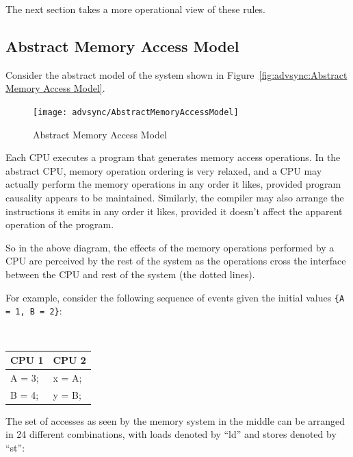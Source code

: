 The next section takes a more operational view of these rules.

\subsection{Abstract Memory Access Model}

Consider the abstract model of the system shown in
Figure~\ref{fig:advsync:Abstract Memory Access Model}.

\begin{figure}[htb]
\begin{center}
\texttt{[image: advsync/AbstractMemoryAccessModel]}
\end{center}
\caption{Abstract Memory Access Model}
\end{figure}

Each CPU executes a program that generates memory access operations.  In the
abstract CPU, memory operation ordering is very relaxed, and a CPU may actually
perform the memory operations in any order it likes, provided program causality
appears to be maintained.  Similarly, the compiler may also arrange the
instructions it emits in any order it likes, provided it doesn't affect the
apparent operation of the program.

So in the above diagram, the effects of the memory operations performed by a
CPU are perceived by the rest of the system as the operations cross the
interface between the CPU and rest of the system (the dotted lines).


For example, consider the following sequence of events given the
initial values {\tt \{A = 1, B = 2\}}:

\vspace{5pt}
\begin{minipage}[t]{\columnwidth}
\tt
\scriptsize
\begin{tabular}{l|l}
	CPU 1 &		CPU 2 \\
	\hline
	A = 3; &	x = A; \\
	B = 4; &	y = B; \\
\end{tabular}
\end{minipage}
\vspace{5pt}

The set of accesses as seen by the memory system in the middle can be arranged
in 24 different combinations, with loads denoted by ``ld'' and stores
denoted by ``st'':

